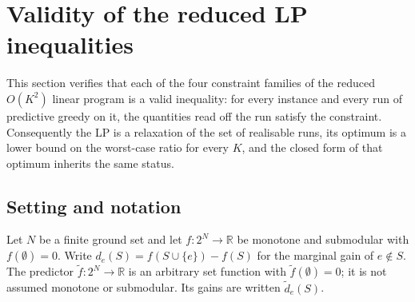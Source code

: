 %
%

\section{Validity of the reduced LP inequalities}
\label{sec:reduced-lp-validity}

This section verifies that each of the four constraint families of the reduced
$O(K^2)$ linear program is a valid inequality: for every instance and every run
of predictive greedy on it, the quantities read off the run satisfy the
constraint. Consequently the LP is a relaxation of the set of realisable runs,
its optimum is a lower bound on the worst-case ratio for every $K$, and the
closed form of that optimum inherits the same status.

\subsection{Setting and notation}

Let $N$ be a finite ground set and let $f \colon 2^{N} \to \mathbb{R}$ be
monotone and submodular with $f(\emptyset) = 0$. Write
$d_{e}(S) = f(S \cup \{e\}) - f(S)$ for the marginal gain of $e \notin S$.
The predictor $\tilde f \colon 2^{N} \to \mathbb{R}$ is an arbitrary set
function with $\tilde f(\emptyset) = 0$; it is not assumed monotone or
submodular. Its gains are written $\tilde d_{e}(S)$.

